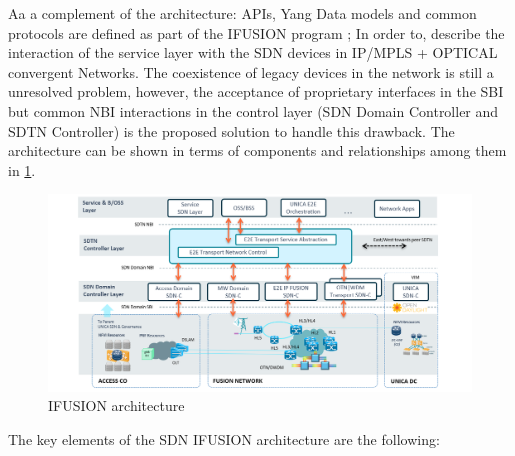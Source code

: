\documentclass[a4paper,fleqn]{cas-dc}
\begin{document}
Aa a complement of the architecture: APIs, Yang Data models and common protocols are defined as part of the \uppercase{iFUSION} program \cite{apistelefonica}; In order to, describe the interaction of the service layer with the SDN devices in IP/MPLS + OPTICAL convergent Networks. The coexistence of legacy devices in the network is still a unresolved problem, however, the acceptance of proprietary interfaces in the SBI but common NBI interactions in the control layer (SDN Domain Controller and SDTN Controller) is the proposed solution to handle this drawback. The architecture can be shown in terms of components and relationships among them in \cref{FIG:1}. 

\begin{figure}
	\centering
		\includegraphics[width=\linewidth]{figs/ifusion_architecture.png}
	\caption{\uppercase{iFUSION} architecture}
	\label{FIG:1}
\end{figure}

The key elements of the SDN \uppercase{iFUSION} architecture are the following:
\end{document}

